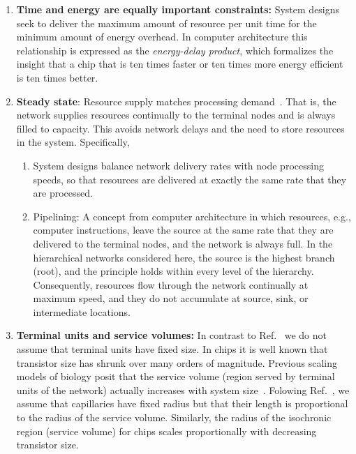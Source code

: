 \documentclass[12pt]{article}
\begin{document}
\begin{enumerate}
\item {\bf Time and energy are equally important constraints:} 
  System designs seek to deliver the maximum amount of
  resource per unit time for the minimum amount of energy overhead. 
  In computer architecture this relationship is expressed as the
  \emph{energy-delay product}, which formalizes the insight that a
  chip that is ten times faster or ten times more energy efficient is
  ten times better. 

\item {\bf Steady state}: Resource supply matches processing
  demand~\cite{banavar10}.  That is, the network supplies
  resources continually to the terminal nodes and is
  always filled to capacity.  This avoids network delays and the need to
  store resources in the system. Specifically,
\begin{enumerate}
\item System designs balance network delivery rates with node
  processing speeds, so that resources are delivered at exactly the
  same rate that they are processed.

\item Pipelining: A concept from computer architecture in which
  resources, e.g., computer instructions, leave the source at
  the same rate that they are delivered to the terminal nodes, and the
  network is always full.  In the hierarchical networks considered
  here, the source is the highest branch (root), and the
  principle holds within every level of the hierarchy.  Consequently,
  resources flow through the network continually at maximum speed, and
  they do not accumulate at source, sink, or
  intermediate locations.
\end{enumerate}

\item {\bf Terminal units and service volumes:} In contrast to Ref.~\cite{west97} we
  do not assume that terminal units have
  fixed size.   In chips it is well known that transistor size has
  shrunk over many orders of magnitude.   Previous scaling models of
  biology posit that the service volume (region served by terminal units of the network) actually increases with system
  size~\cite{west97,banavar10}.  Folowing Ref.~\cite{banavar10}, we assume that
  capillaries have fixed radius but that their length is proportional to the
  radius of the service volume.   Similarly, the radius of the isochronic region
  (service volume) for chips scales proportionally with decreasing
  transistor size.
\end{enumerate}
\end{document}
